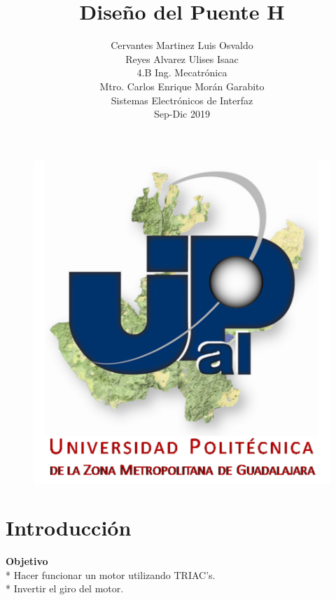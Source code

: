 \documentclass[12pt,a4paper]{article}
\author{Cervantes Martinez Luis Osvaldo\\Reyes Alvarez Ulises Isaac\\4.B Ing. Mecatrónica\\Mtro. Carlos Enrique Morán Garabito\\Sistemas Electrónicos de Interfaz\\Sep-Dic 2019}
\title{Diseño del Puente H}
\begin{document}
\maketitle
\begin{figure}[hbtp]
\centering
\includegraphics[scale=1.8]{Pictures/Universidad.png}
\end{figure}

\newpage
\section{Introducción}
\textbf{Objetivo}\\
* Hacer funcionar un motor utilizando TRIAC's.\\
* Invertir el giro del motor.\\
\end{document}
